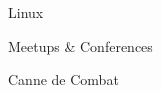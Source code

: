 \begin{SideBar}{\ColorBackground}{\ColorTextSide}
  \begin{ItemList}{\ColorHighlight}
    \item [\ding{72}] Linux
    \item [\ding{72}] Meetups \& Conferences
    \item [\ding{72}] Canne de Combat
  \end{ItemList}
  \vspace{0.5cm}
\end{SideBar}
